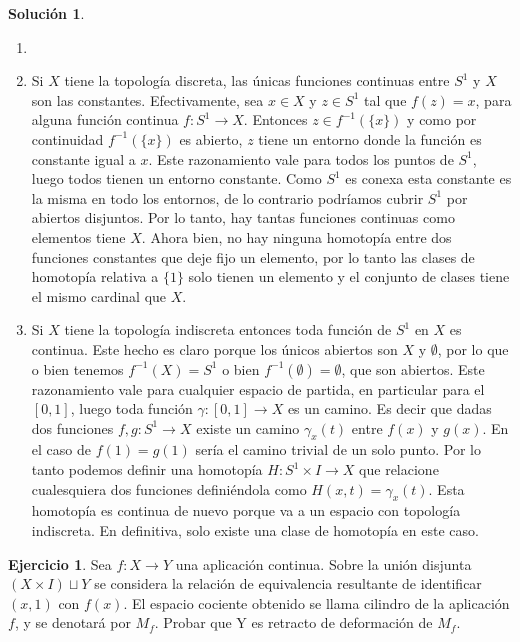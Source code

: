 \documentclass{article}
\theoremstyle{plain}
\theoremstyle{definition}
\newtheorem{exercise}{Ejercicio}
\newtheorem*{sol*}{Solución}
\begin{document}
\begin{sol*}
\begin{enumerate}
\item[]
\item Si $X$ tiene la topología discreta, las únicas funciones continuas entre $S^1$ y $X$ son las constantes. Efectivamente, sea $x\in X$ y $z\in S^1$ tal que $f(z)=x$, para alguna función continua $f:S^1\to X$. Entonces $z\in f^{-1}(\{x\})$ y como por continuidad $f^{-1}(\{x\})$ es abierto, $z$ tiene un entorno donde la función es constante igual a $x$. Este razonamiento vale para todos los puntos de $S^1$, luego todos tienen un entorno constante. Como $S^1$ es conexa esta constante es la misma en todo los entornos, de lo contrario podríamos cubrir $S^1$ por abiertos disjuntos. Por lo tanto, hay tantas funciones continuas como elementos tiene $X$. Ahora bien, no hay ninguna homotopía entre dos funciones constantes que deje fijo un elemento, por lo tanto las clases de homotopía relativa a $\{1\}$ solo tienen un elemento y el conjunto de clases tiene el mismo cardinal que $X$. 
\item Si $X$ tiene la topología indiscreta entonces toda función de $S^1$ en $X$ es continua. Este hecho es claro porque los únicos abiertos son $X$ y $\emptyset$, por lo que o bien tenemos $f^{-1}(X)=S^1$ o bien $f^{-1}(\emptyset)=\emptyset$, que son abiertos. Este razonamiento vale para cualquier espacio de partida, en particular para el $[0,1]$, luego toda función $\gamma:[0,1]\to X$ es un camino. Es decir que dadas dos funciones $f,g:S^1\to X$ existe un camino $\gamma_x(t)$ entre $f(x)$ y $g(x)$. En el caso de $f(1)=g(1)$ sería el camino trivial de un solo punto. Por lo tanto podemos definir una homotopía $H:S^1\times I\to X$ que relacione cualesquiera dos funciones definiéndola como $H(x,t)=\gamma_x(t)$. Esta homotopía es continua de nuevo porque va a un espacio con topología indiscreta. En definitiva, solo existe una clase de homotopía en este caso.
\end{enumerate}
\end{sol*}
\newpage
\begin{exercise}
Sea $f:X\to Y$ una aplicación continua. Sobre la unión disjunta $(X\times I)\sqcup Y$ se considera la relación de equivalencia resultante de identificar $(x,1)$ con $f(x)$. El espacio cociente obtenido se llama cilindro de la aplicación $f$, y se denotará por $M_f$. Probar que Y es retracto de deformación de $M_f$.
\end{exercise}
\end{document}
